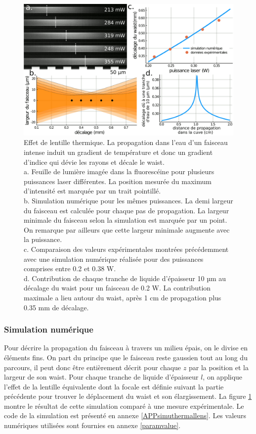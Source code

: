 \begin{figure}
    \centering
    \includegraphics[width=\textwidth]{./files/thermal_shift_model.svg.png}
    \caption{Effet de lentille thermique. La propagation dans l'eau d'un faisceau intense induit un gradient de température et donc un gradient d'indice qui dévie les rayons et décale le waist.
    \\ a. Feuille de lumière imagée dans la fluorescéine pour plusieurs puissances laser différentes. La position mesurée du maximum d'intensité est marquée par un trait pointillé.
    \\ b. Simulation numérique pour les mêmes puissances. La demi largeur du faisceau est calculée pour chaque pas de propagation. La largeur minimale du faisceau selon la simulation est marquée par un point. On remarque par ailleurs que cette largeur minimale augmente avec la puissance.
    \\ c. Comparaison des valeurs expérimentales montrées précédemment avec une simulation numérique réalisée pour des puissances comprises entre 0.2 et 0.38 W.
    \\ d. Contribution de chaque tranche de liquide d'épaisseur 10 µm au décalage du waist pour un faisceau de 0.2 W. La contribution maximale a lieu autour du waist, après 1 cm de propagation plus 0.35 mm de décalage.
    \label{FIGthermalfluorescine}}
    \end{figure}

\subsubsection{Simulation numérique}\label{simuthermallens}

Pour décrire la propagation du faisceau à travers un milieu épais, on le divise en éléments fins.
On part du principe que le faisceau reste gaussien tout au long du parcours, il peut donc être entièrement décrit pour chaque $z$ par la position et la largeur de son waist. Pour chaque tranche de liquide d'épaisseur $l$, on applique l'effet de la lentille équivalente dont la focale est définie suivant la partie précédente pour trouver le déplacement du waist et son élargissement. La figure \ref{FIGthermalfluorescine} montre le résultat de cette simulation comparé à une mesure expérimentale. Le code de la simulation est présenté en annexe \ref{APPsimuthermallens}. Les valeurs numériques utilisées sont fournies en annexe \ref{paramvalue}.

